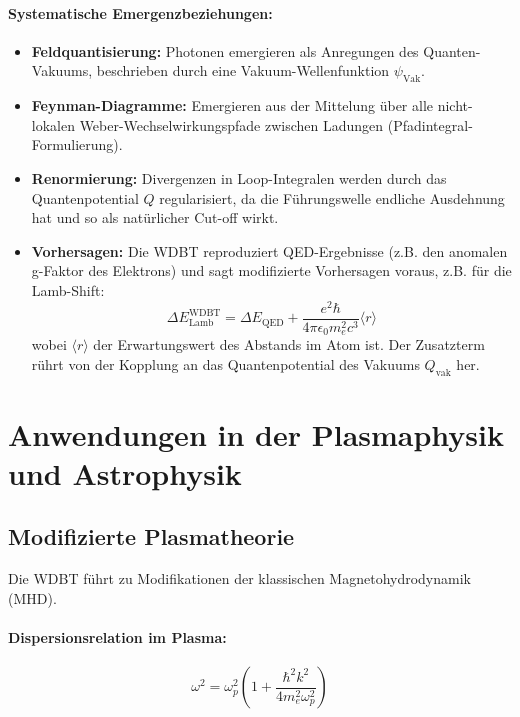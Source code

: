 \documentclass[11pt, a4paper]{article}
\begin{document}
\paragraph{Systematische Emergenzbeziehungen:}
\begin{itemize}
    \item \textbf{Feldquantisierung:} Photonen emergieren als Anregungen des Quanten-Vakuums, beschrieben durch eine Vakuum-Wellenfunktion $\psi_{\text{Vak}}$.
    \item \textbf{Feynman-Diagramme:} Emergieren aus der Mittelung über alle nicht-lokalen Weber-Wechselwirkungspfade zwischen Ladungen (Pfadintegral-Formulierung).
    \item \textbf{Renormierung:} Divergenzen in Loop-Integralen werden durch das Quantenpotential $Q$ regularisiert, da die Führungswelle endliche Ausdehnung hat und so als natürlicher Cut-off wirkt.
    \item \textbf{Vorhersagen:} Die WDBT reproduziert QED-Ergebnisse (z.B. den anomalen g-Faktor des Elektrons) und sagt modifizierte Vorhersagen voraus, z.B. für die Lamb-Shift:
    \begin{equation}
    \label{eq:lamb_shift}
    \Delta E^{\text{WDBT}}_{\text{Lamb}} = \Delta E_{\text{QED}} + \frac{e^2 \hbar}{4\pi\epsilon_0 m_e^2 c^3} \langle r \rangle
    \end{equation}
    wobei $\langle r \rangle$ der Erwartungswert des Abstands im Atom ist. Der Zusatzterm rührt von der Kopplung an das Quantenpotential des Vakuums $Q_{\text{vak}}$ her.
\end{itemize}

\section{Anwendungen in der Plasmaphysik und Astrophysik}
\label{sec:anwendungen}

\subsection{Modifizierte Plasmatheorie}
\label{subsec:plasma}

Die WDBT führt zu Modifikationen der klassischen Magnetohydrodynamik (MHD).

\paragraph{Dispersionsrelation im Plasma:}
\begin{equation}
\label{eq:dispersion}
\omega^2 = \omega_p^2 \left( 1 + \frac{\hbar^2 k^2}{4m_e^2 \omega_p^2} \right)
\end{equation}
\end{document}
